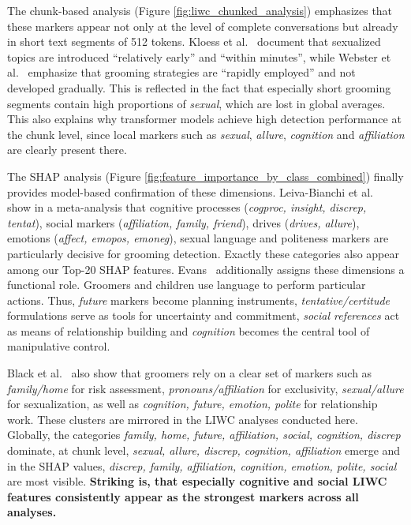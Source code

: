 The chunk-based analysis (Figure \ref{fig:liwc_chunked_analysis}) emphasizes that these markers appear not only at the level of complete conversations but already in short text segments of 512 tokens. Kloess et al.~\cite{kloess2014online} document that sexualized topics are introduced “relatively early” and “within minutes”, while Webster et al.~\cite{webster2021european} emphasize that grooming strategies are “rapidly employed” and not developed gradually. This is reflected in the fact that especially short grooming segments contain high proportions of \textit{sexual}, which are lost in global averages. This also explains why transformer models achieve high detection performance at the chunk level, since local markers such as \textit{sexual}, \textit{allure}, \textit{cognition} and \textit{affiliation} are clearly present there.

The SHAP analysis (Figure \ref{fig:feature_importance_by_class_combined}) finally provides model-based confirmation of these dimensions. Leiva-Bianchi et al.~\cite{leiva2024meta} show in a meta-analysis that cognitive processes (\textit{cogproc, insight, discrep, tentat}), social markers (\textit{affiliation, family, friend}), drives (\textit{drives, allure}), emotions (\textit{affect, emopos, emoneg}), sexual language and politeness markers are particularly decisive for grooming detection. Exactly these categories also appear among our Top-20 SHAP features. Evans~\cite{evans2025corpus} additionally assigns these dimensions a functional role. Groomers and children use language to perform particular actions. Thus, \textit{future} markers become planning instruments, \textit{tentative/certitude} formulations serve as tools for uncertainty and commitment, \textit{social references} act as means of relationship building and \textit{cognition} becomes the central tool of manipulative control.  

Black et al.~\cite{black2015linguistic} also show that groomers rely on a clear set of markers such as \textit{family/home} for risk assessment, \textit{pronouns/affiliation} for exclusivity, \textit{sexual/allure} for sexualization, as well as \textit{cognition, future, emotion, polite} for relationship work. These clusters are mirrored in the LIWC analyses conducted here. Globally, the categories \textit{family, home, future, affiliation, social, cognition, discrep} dominate, at chunk level, \textit{sexual, allure, discrep, cognition, affiliation} emerge and in the SHAP values, \textit{discrep, family, affiliation, cognition, emotion, polite, social} are most visible. \textbf{Striking is, that especially cognitive and social LIWC features consistently appear as the strongest markers across all analyses.}

